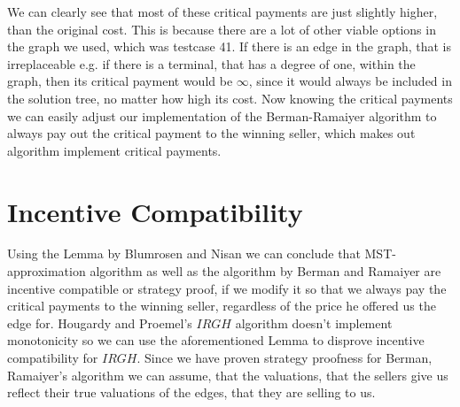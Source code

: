 We can clearly see that most of these critical payments are just slightly higher, than the original cost. This is because there are a lot of other viable options in the graph we used, which was testcase 41. If there is an edge in the graph, that is irreplaceable e.g. if there is a terminal, that has a degree of one, within the graph, then its critical payment would be $\infty$, since it would always be included in the solution tree, no matter how high its cost. Now knowing the critical payments we can easily adjust our implementation of the Berman-Ramaiyer algorithm to always pay out the critical payment to the winning seller, which makes out algorithm implement critical payments. 


\section{Incentive Compatibility}

Using the Lemma by Blumrosen and Nisan \cite{BlNi07} we can conclude that MST-approximation algorithm as well as the algorithm by Berman and Ramaiyer are incentive compatible or strategy proof, if we modify it so that we always pay the critical payments to the winning seller, regardless of the price he offered us the edge for. Hougardy and Proemel's $IRGH$ algorithm doesn't implement monotonicity so we can use the aforementioned Lemma to disprove incentive compatibility for $IRGH$. Since we have proven strategy proofness for Berman, Ramaiyer's algorithm we can assume, that the valuations, that the sellers give us reflect their true valuations of the edges, that they are selling to us. 